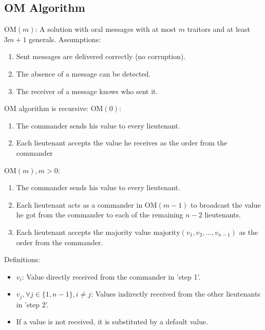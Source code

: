 \subsection{OM Algorithm}
\( \text{OM}(m) \): A solution with oral messages with at most \( m \) traitors and at least \( 3m+1 \) generals.
   Assumptions:
        \begin{enumerate}
            \item Sent messages are delivered correctly (no corruption).
            \item The absence of a message can be detected.
            \item The receiver of a message knows who sent it.
        \end{enumerate}
  
     OM algorithm is recursive:
     \( \text{OM}(0) \):
        \begin{enumerate}
            \item The commander sends his value to every lieutenant.
            \item Each lieutenant accepts the value he receives as the order from the commander
        \end{enumerate}
       \( \text{OM}(m), m > 0 \):
        \begin{enumerate}
            \item The commander sends his value to every lieutenant.
            \item Each lieutenant acts as a commander in \( \text{OM}(m-1) \) to broadcast the value he got from the commander to each of the remaining \( n-2 \) lieutenants.
            \item Each lieutenant accepts the majority value \( \text{majority}(v_1, v_2, \ldots, v_{n-1}) \) as the order from the commander.
        \end{enumerate}
   
     Definitions:
    \begin{itemize}
        \item \( v_i \): Value directly received from the commander in 'step 1'.
        \item \( v_j, \forall j \in \{1, n-1\}, i \neq j \): Values indirectly received from the other lieutenants in 'step 2'.
        \item If a value is not received, it is substituted by a default value.
    \end{itemize}
